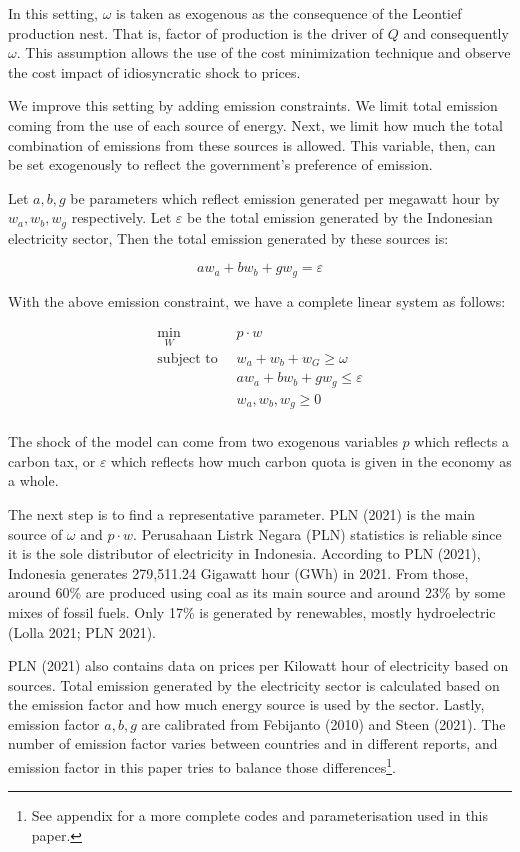 \documentclass[
  a4paper,
  DIV=11,
  numbers=noendperiod]{scrartcl}
\begin{document}
In this setting, \(\omega\) is taken as exogenous as the consequence of
the Leontief production nest. That is, factor of production is the
driver of \(Q\) and consequently \(\omega\). This assumption allows the
use of the cost minimization technique and observe the cost impact of
idiosyncratic shock to prices.

We improve this setting by adding emission constraints. We limit total
emission coming from the use of each source of energy. Next, we limit
how much the total combination of emissions from these sources is
allowed. This variable, then, can be set exogenously to reflect the
government's preference of emission.

Let \(a,b,g\) be parameters which reflect emission generated per
megawatt hour by \(w_a, w_b, w_g\) respectively. Let \(\varepsilon\) be
the total emission generated by the Indonesian electricity sector, Then
the total emission generated by these sources is:

\[
aw_a+bw_b+gw_g=\varepsilon
\]

With the above emission constraint, we have a complete linear system as
follows:

\[
\begin{aligned}
\min_{W} \ &  p \cdot w \\
\mbox{subject to } \ & w_a+ w_b+ w_G \ge \omega \\
 & aw_a+bw_b+gw_g \le \varepsilon \\
 & w_a,w_b,w_g \ge 0\\
\end{aligned}
\]

The shock of the model can come from two exogenous variables \(p\) which
reflects a carbon tax, or \(\varepsilon\) which reflects how much carbon
quota is given in the economy as a whole.

The next step is to find a representative parameter. PLN (2021) is the
main source of \(\omega\) and \(p \cdot w\). Perusahaan Listrk Negara
(PLN) statistics is reliable since it is the sole distributor of
electricity in Indonesia. According to PLN (2021), Indonesia generates
279,511.24 Gigawatt hour (GWh) in 2021. From those, around 60\% are
produced using coal as its main source and around 23\% by some mixes of
fossil fuels. Only 17\% is generated by renewables, mostly hydroelectric
(Lolla 2021; PLN 2021).

PLN (2021) also contains data on prices per Kilowatt hour of electricity
based on sources. Total emission generated by the electricity sector is
calculated based on the emission factor and how much energy source is
used by the sector. Lastly, emission factor \(a,b,g\) are calibrated
from Febijanto (2010) and Steen (2021). The number of emission factor
varies between countries and in different reports, and emission factor
in this paper tries to balance those differences\footnote{See appendix
  for a more complete codes and parameterisation used in this paper.}.
\end{document}
